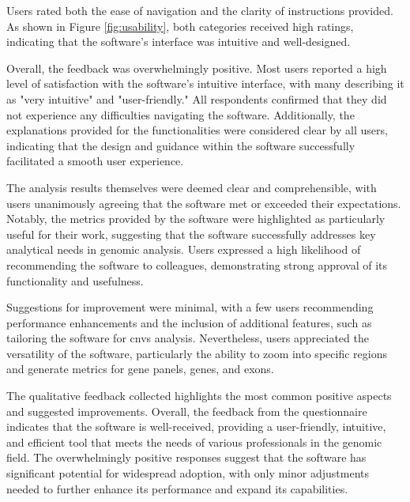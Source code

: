 Users rated both the ease of navigation and the clarity of instructions provided. As shown in Figure \ref{fig:usability}, both categories received high ratings, indicating that the software's interface was intuitive and well-designed.

Overall, the feedback was overwhelmingly positive. Most users reported a high level of satisfaction with the software's intuitive interface, with many describing it as "very intuitive" and "user-friendly." All respondents confirmed that they did not experience any difficulties navigating the software. Additionally, the explanations provided for the functionalities were considered clear by all users, indicating that the design and guidance within the software successfully facilitated a smooth user experience.

The analysis results themselves were deemed clear and comprehensible, with users unanimously agreeing that the software met or exceeded their expectations. Notably, the metrics provided by the software were highlighted as particularly useful for their work, suggesting that the software successfully addresses key analytical needs in genomic analysis. Users expressed a high likelihood of recommending the software to colleagues, demonstrating strong approval of its functionality and usefulness.

Suggestions for improvement were minimal, with a few users recommending performance enhancements and the inclusion of additional features, such as tailoring the software for \ac{cnvs} analysis. Nevertheless, users appreciated the versatility of the software, particularly the ability to zoom into specific regions and generate metrics for gene panels, genes, and exons.

The qualitative feedback collected highlights the most common positive aspects and suggested improvements. Overall, the feedback from the questionnaire indicates that the software is well-received, providing a user-friendly, intuitive, and efficient tool that meets the needs of various professionals in the genomic field. The overwhelmingly positive responses suggest that the software has significant potential for widespread adoption, with only minor adjustments needed to further enhance its performance and expand its capabilities.




